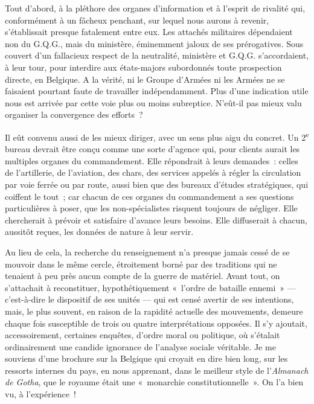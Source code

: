 \documentclass[french,twoside]{book} %
\begin{document}
Tout d’abord, à la pléthore des organes d’information et à l’esprit de rivalité qui, conformément à un fâcheux penchant, sur lequel nous aurons à revenir, s’établissait presque fatalement entre eux. Les attachés militaires dépendaient non du G.Q.G., mais du ministère, éminemment jaloux de ses prérogatives. Sous couvert d’un fallacieux respect de la neutralité, ministère et G.Q.G. s’accordaient, à leur tour, pour interdire aux états-majors subordonnés toute prospection directe, en Belgique. A la vérité, ni le Groupe d’Armées ni les Armées ne se faisaient pourtant faute de travailler indépendamment. Plus d’une indication utile nous est arrivée par cette voie plus ou moins subreptice. N’eût-il pas mieux valu organiser la convergence des efforts ?\par
Il eût convenu aussi de les mieux diriger, avec un sens plus aigu du concret. Un 2\textsuperscript{e} bureau devrait être conçu comme une sorte d’agence qui, pour clients aurait les multiples organes du commandement. Elle répondrait à leurs demandes : celles de l’artillerie, de l’aviation, des chars, des services appelés à régler la circulation par voie ferrée ou par route, aussi bien que des bureaux d’études stratégiques, qui coiffent le tout ; car chacun de ces organes du commandement a ses questions particulières à poser, que les non-spécialistes risquent toujours de négliger. Elle chercherait à prévoir et satisfaire d’avance leurs besoins. Elle diffuserait à chacun, aussitôt reçues, les données de nature à leur servir.\par
Au lieu de cela, la recherche du renseignement n’a presque jamais cessé de se mouvoir dans le même cercle, étroitement borné par des traditions qui ne tenaient à peu près aucun compte de la guerre de matériel. Avant tout, on s’attachait à reconstituer, hypothétiquement « l’ordre de bataille ennemi » — c’est-à-dire le dispositif de ses unités — qui est   censé avertir de ses intentions, mais, le plus souvent, en raison de la rapidité actuelle des mouvements, demeure chaque fois susceptible de trois ou quatre interprétations opposées. Il s’y ajoutait, accessoirement, certaines enquêtes, d’ordre moral ou politique, où s’étalait ordinairement une candide ignorance de l’analyse sociale véritable. Je me souviens d’une brochure sur la Belgique qui croyait en dire bien long, sur les ressorts internes du pays, en nous apprenant, dans le meilleur style de l’{\itshape Almanach de Gotha}, que le royaume était une « monarchie constitutionnelle ». On l’a bien vu, à l’expérience !\par
\end{document}
